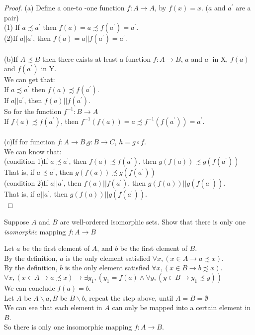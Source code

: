 \documentclass[a4paper, justified]{tufte-handout}
\begin{document}
\begin{proof}
  (a) Define a one-to -one function $f:A \rightarrow A$, by $f(x) = x$.
  ($a$ and $a ^{'}$ are a pair)\\
  (1) If $a\precsim a ^{'}$ then $f(a) = a \precsim f(a^{'}) = a^{'}$.\\
  (2)If $a || a^{'}$, then  $f(a) = a || f(a^{'}) = a^{'}$.\\
  \\
  (b)If $A \precsim B$ then there exists at least a function $f:A \rightarrow B$, $a$ and $a^{'}$ in X, $f(a)$ and $f(a^{'})$ in Y.\\
  We can get that:\\
  If $a\precsim a ^{'}$ then $f(a) \precsim f(a^{'})$.\\
  If $a || a^{'}$, then  $f(a) || f(a^{'})$.\\
  So for the function $f^{-1}:B \rightarrow A$\\
  If $f(a) \precsim f(a^{'})$, then $f^{-1}(f(a)) = a \precsim f^{-1}(f(a^{'})) = a^{'}$.\\
  \\
  (c)If for function $f:A \rightarrow B$,$g:B\rightarrow C$, $h = g\circ f$.\\
  We can know that:\\
  (condition 1)If $a\precsim a ^{'}$, then $f(a) \precsim f(a^{'})$, then $g(f(a)) \precsim g(f(a^{'}))$\\
  That is, if $a\precsim a ^{'}$, then $g(f(a)) \precsim g(f(a^{'}))$\\
  (condition 2)If $a || a^{'}$, then  $f(a) || f(a^{'})$, then $g(f(a)) || g(f(a^{'}))$.\\
  That is, if  $a || a^{'}$, then $g(f(a)) || g(f(a^{'}))$.\\


\end{proof}

\begin{problem}[SM Problem 14.62]
Suppose $A$ and $B$ are well-ordered isomorphic sets.
Show that there is only one {\it isomorphic} mapping
$f: A \to B$
\end{problem}

\begin{solution}
  Let $a$ be the first element of $A$, and $b$ be the first element of $B$.\\
  By the definition, $a$ is the only element satisfied $\forall x, (x\in A\to a\precsim x).$\\
  By the definition, $b$ is the only element satisfied $\forall x, (x\in B \to b\precsim x).$\\
  $\forall x,(x\in A \to a\precsim x)\to \exists y_1, (y_1 = f(a) \land \forall y,(y\in B\to y_1\precsim y))$\\
  We can conclude $f(a) = b$.\\
  Let $A$ be $A \backslash a, B$ be $B \backslash b$, repeat the step above, until $A = B = \emptyset$\\
  We can see that each element in $A$ can only be mapped into a certain element in $B$.\\
  So there is only one insomorphic mapping $f:A\to B$.
\end{solution}
\end{document}
